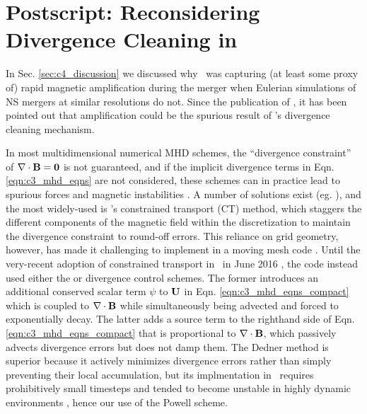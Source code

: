 \section{Postscript: Reconsidering Divergence Cleaning in \arepo}
\label{sec:c4_postscript}

In Sec. \ref{sec:c4_discussion} we discussed why \arepo\ was capturing (at least some proxy of) rapid magnetic amplification during the merger when Eulerian simulations of NS mergers at similar resolutions do not.  Since the publication of \citeal{zhu+15}, it has been pointed out that amplification could be the spurious result of \arepo's divergence cleaning mechanism.


In most multidimensional numerical MHD schemes, the ``divergence constraint'' of $\bf{\nabla\cdot B} = 0$ is not guaranteed, and if the implicit divergence terms in Eqn. \ref{eqn:c3_mhd_eqns} are not considered, these schemes can in practice lead to spurious forces and magnetic instabilities \citep{toth00, hopkr16}.  A number of solutions exist (eg. \citealt{toth00}), and the most widely-used is \cite{evanh88}'s constrained transport (CT) method, which staggers the different components of the magnetic field within the discretization to maintain the divergence constraint to round-off errors.  This reliance on grid geometry, however, has made it challenging to implement in a moving mesh code \citep{moczvh14}.  Until the very-recent adoption of constrained transport in \arepo\ in June 2016 \citep{mocz+16}, the code instead used either the \cite{dedn+02} or \cite{powe+99} divergence control schemes.  The former introduces an additional conserved scalar term $\psi$ to ${\bf U}$ in Eqn. \ref{eqn:c3_mhd_eqns_compact} which is coupled to $\bf{\nabla\cdot B}$ while simultaneously being advected and forced to exponentially decay.  The latter adds a source term to the righthand side of Eqn. \ref{eqn:c3_mhd_eqns_compact} that is proportional to $\bf{\nabla\cdot B}$, which passively advects divergence errors but does not damp them.  The Dedner method is superior because it actively minimizes divergence errors rather than simply preventing their local accumulation, but its implmentation in \arepo\ requires prohibitively small timesteps and tended to become unstable in highly dynamic environments \citep{pakms13}, hence our use of the Powell scheme.

